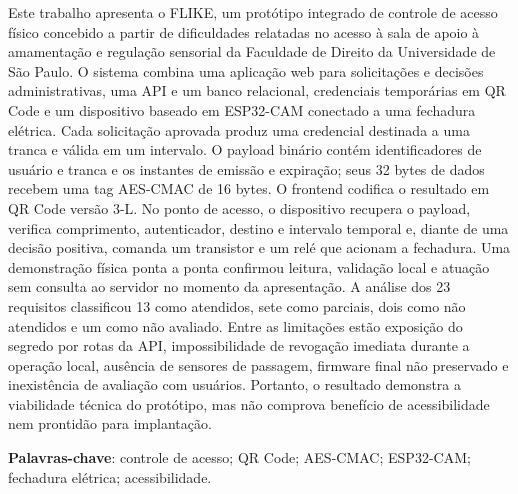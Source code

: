 \documentclass[
	12pt,				%
	openright,			%
	twoside,			%
	a4paper,			%
	english,			%
	french,				%
	spanish,			%
	brazil				%
	]{abntex2}
\begin{document}
\setlength{\absparsep}{18pt} %
\begin{resumo}
Este trabalho apresenta o FLIKE, um protótipo integrado de controle de acesso físico concebido a partir de dificuldades relatadas no acesso à sala de apoio à amamentação e regulação sensorial da Faculdade de Direito da Universidade de São Paulo. O sistema combina uma aplicação web para solicitações e decisões administrativas, uma API e um banco relacional, credenciais temporárias em QR Code e um dispositivo baseado em ESP32-CAM conectado a uma fechadura elétrica. Cada solicitação aprovada produz uma credencial destinada a uma tranca e válida em um intervalo. O payload binário contém identificadores de usuário e tranca e os instantes de emissão e expiração; seus 32 bytes de dados recebem uma tag AES-CMAC de 16 bytes. O frontend codifica o resultado em QR Code versão 3-L. No ponto de acesso, o dispositivo recupera o payload, verifica comprimento, autenticador, destino e intervalo temporal e, diante de uma decisão positiva, comanda um transistor e um relé que acionam a fechadura. Uma demonstração física ponta a ponta confirmou leitura, validação local e atuação sem consulta ao servidor no momento da apresentação. A análise dos 23 requisitos classificou 13 como atendidos, sete como parciais, dois como não atendidos e um como não avaliado. Entre as limitações estão exposição do segredo por rotas da API, impossibilidade de revogação imediata durante a operação local, ausência de sensores de passagem, firmware final não preservado e inexistência de avaliação com usuários. Portanto, o resultado demonstra a viabilidade técnica do protótipo, mas não comprova benefício de acessibilidade nem prontidão para implantação.

\textbf{Palavras-chave}: controle de acesso; QR Code; AES-CMAC; ESP32-CAM; fechadura elétrica; acessibilidade.
\end{resumo}
\end{document}
